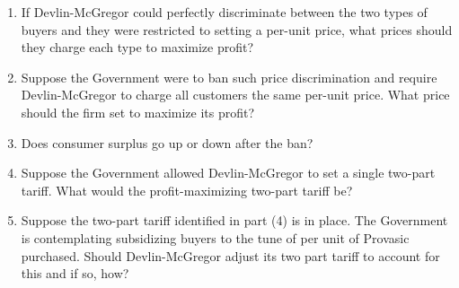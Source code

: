 \documentclass{article}
\begin{document}
\begin{enumerate}
\item If Devlin-McGregor could perfectly discriminate between the two types of buyers and they were restricted to setting a per-unit price, what prices should they charge each type to maximize profit?
\item Suppose the Government were to ban such price discrimination and require Devlin-McGregor to charge all customers the same per-unit price. What price should the firm set to maximize its profit?
\item Does consumer surplus go up or down after the ban?
\item  Suppose the Government allowed Devlin-McGregor to set a single two-part tariff. What would the profit-maximizing two-part tariff be?
\item Suppose the two-part tariff identified in part (4) is in place. The Government is contemplating subsidizing buyers to the tune of  per unit of Provasic purchased. Should Devlin-McGregor adjust its two part tariff to account for this and if so, how?
\end{enumerate}
\end{document}
